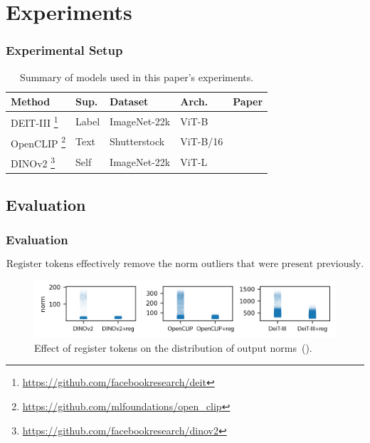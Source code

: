 \documentclass[aspectratio=169]{beamer}
\begin{document}


\section{Experiments}

\begin{frame}
\frametitle{Experimental Setup}
\vspace{2.3em}
\begin{table}[h]
    \centering
    \caption{Summary of models used in this paper's experiments.}
    \begin{tabular}{lllll}
        \toprule
        Method & Sup. & Dataset & Arch. & Paper \\
        \midrule
        DEIT-III \footnote{\url{https://github.com/facebookresearch/deit}} & Label & ImageNet-22k & ViT-B & \cite{touvronDeiTIIIRevenge2022} \\
        OpenCLIP \footnote{\url{https://github.com/mlfoundations/open_clip}} & Text & Shutterstock & ViT-B/16 & \cite{ilharco_gabriel_2021_5143773} \\
        DINOv2 \footnote{\url{https://github.com/facebookresearch/dinov2}} & Self & ImageNet-22k & ViT-L & \cite{oquabDINOv2LearningRobust2024} \\
        \bottomrule
    \end{tabular}
    \label{tab:methods}
\end{table}
\end{frame}

\subsection{Evaluation}

\begin{frame}
\frametitle{Evaluation}
\vspace{2em}

$$
\boxed{\text{Register tokens effectively remove the norm outliers that were present previously.}}
$$

\vspace{2em}
\begin{figure}[t]
    \centering
    \includegraphics[width=\textwidth]{resources/fig_norm_distrib_before_after_stripplot-2.png}
    \caption{
      Effect of register tokens on the distribution of output norms~(\cite{darcetVisionTransformersNeed2024}).
    }
    \label{fig:norm_distrib_before_after}
\end{figure}

\end{frame}
\end{document}
